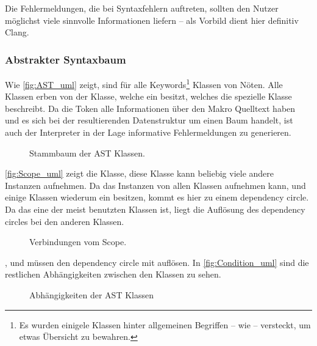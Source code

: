       Die Fehlermeldungen, die bei Syntaxfehlern auftreten, sollten den Nutzer möglichst viele sinnvolle Informationen liefern -- als Vorbild dient hier definitiv Clang.

    \subsubsection{Abstrakter Syntaxbaum}
    \label{sssec:Abstrakter Syntaxbaum}
      Wie \autoref{fig:AST_uml} zeigt, sind für alle Keywords\footnote{
        Es wurden einigele Klassen hinter allgemeinen Begriffen -- wie  -- versteckt, um etwas Übersicht zu bewahren.
      } Klassen von Nöten. Alle Klassen erben von der  Klasse, welche ein  besitzt, welches die spezielle Klasse beschreibt. Da die Token alle Informationen  über den Makro Quelltext haben und es sich bei der resultierenden Datenstruktur um einen Baum handelt, ist auch der Interpreter in der Lage informative Fehlermeldungen zu generieren.
      \begin{figure}[H]
        \centering
        \caption{Stammbaum der AST Klassen.}
        \label{fig:AST_uml}
      \end{figure}

      \autoref{fig:Scope_uml} zeigt die  Klasse, diese Klasse kann beliebig viele andere  Instanzen aufnehmen.  Da das  Instanzen von allen  Klassen aufnehmen kann, und einige Klassen wiederum ein  besitzen, kommt es hier zu einem dependency circle. Da das  eine der meist benutzten Klassen ist, liegt die Auflösung des dependency circles bei den anderen Klassen.
      \begin{figure}[H]
        \centering
        \caption{Verbindungen vom Scope.}
        \label{fig:Scope_uml}
      \end{figure}

      ,  und  müssen den dependency circle mit  auflösen. In \autoref{fig:Condition_uml} sind die restlichen Abhängigkeiten zwischen den  Klassen zu sehen.
      \begin{figure}[H]
        \centering
        \caption{Abhängigkeiten der AST Klassen}
        \label{fig:Condition_uml}
      \end{figure}

